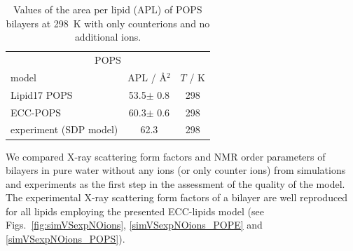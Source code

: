 \documentclass[journal=jpcbfk,manuscript=article]{achemso}
\begin{document}
\begin{table}[tb!] 
\centering
  \caption{Values of the area per lipid (APL) of POPS bilayers 
	   at 298~K with only  counterions and no additional ions. \label{tab:apls} } 
  \begin{tabular}{l|c c} 
    \multicolumn{3}{c}{POPS} \\
    model          & APL / Å$^2$   & $T$ / K  \\ 
    \hline 
    Lipid17 POPS              & 53.5$\pm$ 0.8  &  298 \\ 
    \hline 
    ECC-POPS                & 60.3$\pm$ 0.6  &  298       \\ 
    \hline 
    experiment (SDP model) \citep{kucerka14} & 62.3  &  298    \\ 
    \hline 
  \end{tabular} 
\end{table} 
 
 
We compared X-ray scattering form factors and NMR order parameters of bilayers
in pure water without any ions (or only counter ions)
from simulations and experiments
as the first step in the assessment of the quality of the model. 
The experimental X-ray scattering form factors 
of a bilayer are well reproduced for all lipids employing the presented ECC-lipids model 
(see Figs.~\ref{fig:simVSexpNOions}, \ref{simVSexpNOions_POPE} and \ref{simVSexpNOions_POPS}). 
\end{document}
